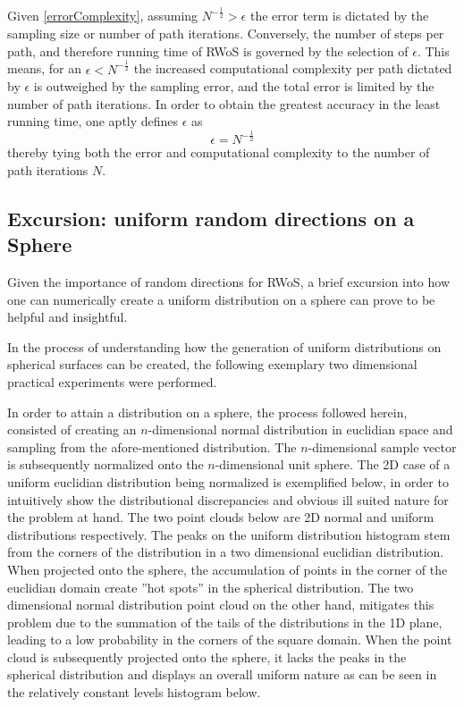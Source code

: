  Given \ref{errorComplexity}, assuming $N^{-\frac{1}{2}} > \epsilon$ the error term
 is dictated by the sampling size or number of path iterations.  Conversely, the number of steps per path,
 and therefore running time of \Gls{RWoS} is governed by the selection of $\epsilon$.
 This means, for an $\epsilon < N^{-\frac{1}{2}}$ the increased computational complexity
 per path dictated by $\epsilon$ is outweighed by the sampling error, and the total error is limited
 by the number of path iterations.  In order to obtain the greatest accuracy in
 the least running time, one aptly defines $\epsilon$ as $$\epsilon = N^{-\frac{1}{2}}$$\label{epsilonDefinition}
 thereby tying both the error and computational complexity to the number of path
  iterations $N$\cite{Bornemann}.
\subsection{Excursion: uniform random directions on a Sphere}\label{uniformPoints}
Given the importance of random directions for \Gls{RWoS}, a brief excursion
into how one can numerically create a uniform distribution on a sphere can prove
to be helpful and insightful.

In the process of understanding how the generation of uniform distributions on
spherical surfaces can be created, the following exemplary two dimensional practical
experiments were performed.

In order to attain a distribution on a sphere, the process followed herein,
consisted of creating an $n$-dimensional normal distribution in euclidian space and
sampling from the afore-mentioned distribution.  The $n$-dimensional sample vector
is subsequently normalized onto the $n$-dimensional unit sphere.
The 2D case of a uniform
euclidian distribution being normalized is exemplified below, in order to intuitively
show the distributional discrepancies and obvious ill suited nature for the problem
at hand.  The two point clouds below are 2D normal and uniform distributions
respectively.  The peaks on the uniform distribution histogram stem from the corners
of the distribution in a two dimensional euclidian distribution.  When projected onto
the sphere, the accumulation of points in the corner of the euclidian domain create
''hot spots'' in the spherical distribution.  The two dimensional normal
distribution point cloud on the other hand, mitigates this problem due to the summation
of the tails of the distributions in the 1D plane, leading to a low probability
in the corners of the square domain.  When the point cloud  is subsequently projected
onto the sphere, it lacks the peaks in the  spherical distribution and displays an
overall uniform nature as can be seen in the relatively constant levels  histogram below.

